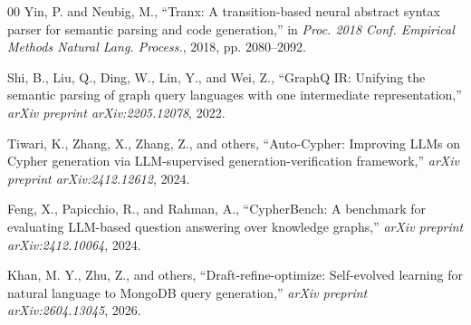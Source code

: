 \documentclass[conference]{IEEEtran}
\begin{document}
\begin{thebibliography}{00}
 Yin, P. and Neubig, M., ``Tranx: A transition-based neural abstract syntax parser for semantic parsing and code generation,'' in \textit{Proc. 2018 Conf. Empirical Methods Natural Lang. Process.}, 2018, pp. 2080--2092.

 Shi, B., Liu, Q., Ding, W., Lin, Y., and Wei, Z., ``GraphQ IR: Unifying the semantic parsing of graph query languages with one intermediate representation,'' \textit{arXiv preprint arXiv:2205.12078}, 2022.

 Tiwari, K., Zhang, X., Zhang, Z., and others, ``Auto-Cypher: Improving LLMs on Cypher generation via LLM-supervised generation-verification framework,'' \textit{arXiv preprint arXiv:2412.12612}, 2024.

 Feng, X., Papicchio, R., and Rahman, A., ``CypherBench: A benchmark for evaluating LLM-based question answering over knowledge graphs,'' \textit{arXiv preprint arXiv:2412.10064}, 2024.

 Khan, M. Y., Zhu, Z., and others, ``Draft-refine-optimize: Self-evolved learning for natural language to MongoDB query generation,'' \textit{arXiv preprint arXiv:2604.13045}, 2026.

\end{thebibliography}
\end{document}
